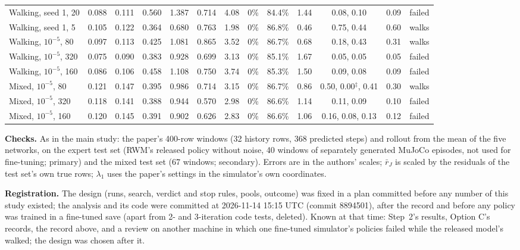 \begin{table}[h]
{\begin{tabular}{@{}lcccccccccccc@{}}
Walking, seed 1, 20 & 0.088 & 0.111 & 0.560 & 1.387 & 0.714 & 4.08 & 0\% & 84.4\% & 1.44 & 0.08, 0.10 & 0.09 & failed \\
Walking, seed 1, 5 & 0.105 & 0.122 & 0.364 & 0.680 & 0.763 & 1.98 & 0\% & 86.8\% & 0.46 & 0.75, 0.44 & 0.60 & walks \\
Walking, $10^{-5}$, 80 & 0.097 & 0.113 & 0.425 & 1.081 & 0.865 & 3.52 & 0\% & 86.7\% & 0.68 & 0.18, 0.43 & 0.31 & walks \\
Walking, $10^{-5}$, 320 & 0.075 & 0.090 & 0.383 & 0.928 & 0.699 & 3.13 & 0\% & 85.1\% & 1.67 & 0.05, 0.05 & 0.05 & failed \\
Walking, $10^{-5}$, 160 & 0.086 & 0.106 & 0.458 & 1.108 & 0.750 & 3.74 & 0\% & 85.3\% & 1.50 & 0.09, 0.08 & 0.09 & failed \\
Mixed, $10^{-5}$, 80 & 0.121 & 0.147 & 0.395 & 0.986 & 0.714 & 3.15 & 0\% & 86.7\% & 0.86 & 0.50, 0.00$^\ddagger$, 0.41 & 0.30 & walks \\
Mixed, $10^{-5}$, 320 & 0.118 & 0.141 & 0.388 & 0.944 & 0.570 & 2.98 & 0\% & 86.6\% & 1.14 & 0.11, 0.09 & 0.10 & failed \\
Mixed, $10^{-5}$, 160 & 0.120 & 0.145 & 0.391 & 0.902 & 0.626 & 2.83 & 0\% & 86.6\% & 1.06 & 0.16, 0.08, 0.13 & 0.12 & failed \\
\bottomrule
\end{tabular}}
\end{table}

\textbf{Checks.} As in the main study: the paper's 400-row windows (32 history rows, 368 predicted steps) and rollout
from the mean of the five networks, on the expert test set (RWM's released policy without noise, 40 windows of separately
generated MuJoCo episodes, not used for fine-tuning; primary) and the mixed test set (67 windows; secondary). Errors are in the
authors' scales; $\bar r_J$ is scaled by the residuals of the test set's own true rows; $\lambda_1$ uses the paper's
settings in the simulator's own coordinates.

\textbf{Registration.} The design (runs, search, verdict and stop rules, pools, outcome) was fixed in a plan committed
before any number of this study existed; the analysis and its code were committed at 2026-11-14 15:15 UTC (commit
8894501), after the record and before any policy was trained in a fine-tuned save (apart from 2- and 3-iteration code
tests, deleted). Known at that time: Step~2's
results, Option C's records, the record above, and a review on another machine in which one fine-tuned simulator's
policies failed while the released model's walked; the design was chosen after it.

